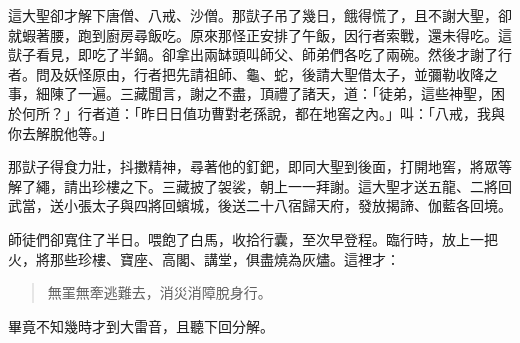 這大聖卻才解下唐僧、八戒、沙僧。那獃子吊了幾日，餓得慌了，且不謝大聖，卻就蝦著腰，跑到廚房尋飯吃。原來那怪正安排了午飯，因行者索戰，還未得吃。這獃子看見，即吃了半鍋。卻拿出兩缽頭叫師父、師弟們各吃了兩碗。然後才謝了行者。問及妖怪原由，行者把先請祖師、龜、蛇，後請大聖借太子，並彌勒收降之事，細陳了一遍。三藏聞言，謝之不盡，頂禮了諸天，道：「徒弟，這些神聖，困於何所？」行者道：「昨日日值功曹對老孫說，都在地窖之內。」叫：「八戒，我與你去解脫他等。」

那獃子得食力壯，抖擻精神，尋著他的釘鈀，即同大聖到後面，打開地窖，將眾等解了繩，請出珍樓之下。三藏披了袈裟，朝上一一拜謝。這大聖才送五龍、二將回武當，送小張太子與四將回蠙城，後送二十八宿歸天府，發放揭諦、伽藍各回境。

師徒們卻寬住了半日。喂飽了白馬，收拾行囊，至次早登程。臨行時，放上一把火，將那些珍樓、寶座、高閣、講堂，俱盡燒為灰燼。這裡才：
\begin{quote}
無罣無牽逃難去，消災消障脫身行。
\end{quote}

畢竟不知幾時才到大雷音，且聽下回分解。
